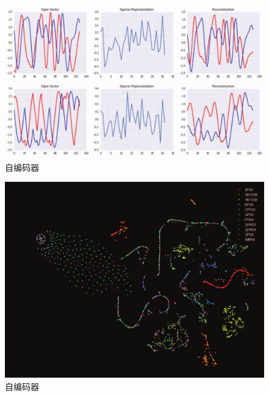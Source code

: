 \begin{figure}[!h]
	\centering
	\includegraphics[scale=0.2]{figures/chapter_3/examples_cae}
	\caption{自编码器}	\label{fig_3_2}
\end{figure}
\begin{figure}[!h]
	\centering
	\includegraphics[scale=0.2]{figures/chapter_3/cae_fea}
	\caption{自编码器}	\label{fig_3_2}
\end{figure}

